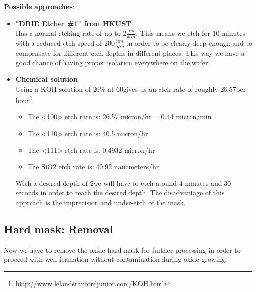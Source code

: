 \textbf{Possible approaches}:
\begin{itemize}
\item \textbf{"DRIE Etcher \#1" from HKUST} \\
Has a normal etching rate of up to $2\frac{\mu m}{min}$.
This means we etch for 10 minutes with a reduced etch speed of $200\frac{nm}{min}$ in order to be clearly deep enough and to compensate for different etch depths in different places.
This way we have a good chance of having proper isolation everywhere on the wafer.

\item \textbf{Chemical solution} \\
Using a KOH solution of 20\% at 60\degreesC gives us an etch rate of roughly  26.57\um per hour\footnote{\url{http://www.lelandstanfordjunior.com/KOH.html}}.
\begin{itemize}
\item The <100> etch rate is: 26.57 micron/hr = 0.44 micron/min
\item The <110> etch rate is: 40.5 micron/hr 
\item The <111> etch rate is: 0.4932 micron/hr 
\item The SiO2 etch rate is: 49.92 nanometers/hr 
\end{itemize}
With a desired depth of 2\um we will have to etch around 4 minutes and 30 seconds in order to reach the desired depth.
The disadvantage of this approach is the imprecision and under-etch of the mask.
\end{itemize}

\subsection{Hard mask: Removal}

Now we have to remove the oxide hard mask for further processing in order to proceed with well formation without contamination during oxide growing.

